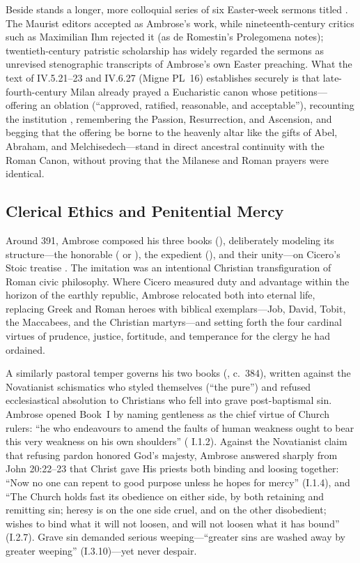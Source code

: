 Beside  stands a longer, more colloquial series of six Easter-week sermons titled . The Maurist editors accepted  as Ambrose's work, while nineteenth-century critics such as Maximilian Ihm rejected it (as de Romestin's Prolegomena notes); twentieth-century patristic scholarship has widely regarded the sermons as unrevised stenographic transcripts of Ambrose's own Easter preaching. What the text of  IV.5.21--23 and IV.6.27 (Migne PL~16) establishes securely is that late-fourth-century Milan already prayed a Eucharistic canon whose petitions---offering an oblation  (``approved, ratified, reasonable, and acceptable''), recounting the institution , remembering the Passion, Resurrection, and Ascension, and begging that the offering be borne to the heavenly altar like the gifts of Abel, Abraham, and Melchisedech---stand in direct ancestral continuity with the Roman Canon, without proving that the Milanese and Roman prayers were identical.

\subsection{Clerical Ethics and Penitential Mercy}

Around 391, Ambrose composed his three books  (), deliberately modeling its structure---the honorable ( or ), the expedient (), and their unity---on Cicero's Stoic treatise . The imitation was an intentional Christian transfiguration of Roman civic philosophy. Where Cicero measured duty and advantage within the horizon of the earthly republic, Ambrose relocated both into eternal life, replacing Greek and Roman heroes with biblical exemplars---Job, David, Tobit, the Maccabees, and the Christian martyrs---and setting forth the four cardinal virtues of prudence, justice, fortitude, and temperance for the clergy he had ordained.

A similarly pastoral temper governs his two books  (, c.~384), written against the Novatianist schismatics who styled themselves  (``the pure'') and refused ecclesiastical absolution to Christians who fell into grave post-baptismal sin. Ambrose opened Book~I by naming gentleness as the chief virtue of Church rulers: ``he who endeavours to amend the faults of human weakness ought to bear this very weakness on his own shoulders'' ( I.1.2). Against the Novatianist claim that refusing pardon honored God's majesty, Ambrose answered sharply from John 20:22--23 that Christ gave His priests both binding and loosing together: ``Now no one can repent to good purpose unless he hopes for mercy'' (I.1.4), and ``The Church holds fast its obedience on either side, by both retaining and remitting sin; heresy is on the one side cruel, and on the other disobedient; wishes to bind what it will not loosen, and will not loosen what it has bound'' (I.2.7). Grave sin demanded serious weeping---``greater sins are washed away by greater weeping'' (I.3.10)---yet never despair.

